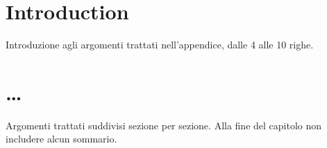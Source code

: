 \section{Introduction}
Introduzione agli argomenti trattati nell'appendice, dalle 4 alle 10 righe.

\section{\dots}
Argomenti trattati suddivisi sezione per sezione. 
Alla fine del capitolo non includere alcun sommario.

